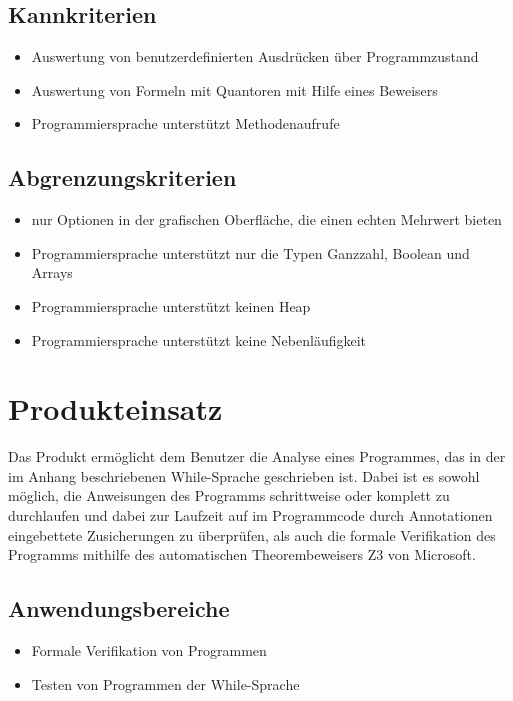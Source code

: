 \documentclass[a4paper,10pt]{article}
\begin{document}
\subsection{Kannkriterien}
\begin{itemize}
  \item Auswertung von benutzerdefinierten Ausdrücken über Programmzustand
  \item Auswertung von Formeln mit Quantoren mit Hilfe eines Beweisers
  \item Programmiersprache unterstützt Methodenaufrufe
\end{itemize}

\subsection{Abgrenzungskriterien}
\begin{itemize}
  \item nur Optionen in der grafischen Oberfläche, die einen echten Mehrwert bieten
  \item Programmiersprache unterstützt nur die Typen Ganzzahl, Boolean und Arrays
  \item Programmiersprache unterstützt keinen Heap
  \item Programmiersprache unterstützt keine Nebenläufigkeit
\end{itemize}

\section{Produkteinsatz}
Das Produkt ermöglicht dem Benutzer die Analyse eines Programmes, das in der im Anhang beschriebenen While-Sprache geschrieben ist. Dabei ist es sowohl möglich, die Anweisungen des Programms schrittweise oder komplett zu durchlaufen und dabei zur Laufzeit auf im Programmcode durch Annotationen eingebettete Zusicherungen zu überprüfen, als auch die formale Verifikation des Programms mithilfe des automatischen Theorembeweisers Z3 von Microsoft. 

\subsection{Anwendungsbereiche}
\begin{itemize}
  \item Formale Verifikation von Programmen
  \item Testen von Programmen der While-Sprache
\end{itemize}
\end{document}
